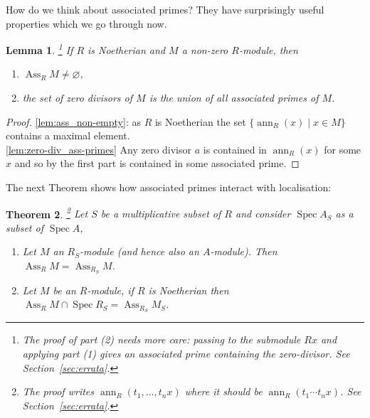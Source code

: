 \documentclass[12pt]{article}
\theoremstyle{plain}
\newtheorem{thm}{Theorem}[subsection] %
\newtheorem{lemma}[thm]{Lemma}
\theoremstyle{definition}
\begin{document}
How do we think about associated primes? They have surprisingly useful properties which we go through now.
\begin{lemma}
\label{lem:ass_nonempty_zero_div}\footnote{The proof of part (2) needs more care: passing to the submodule $Rx$ and applying part (1) gives an associated prime containing the zero-divisor. See Section~\ref{sec:errata}.}
If $R$ is Noetherian and $M$ a non-zero $R$-module, then
\begin{enumerate}
    \item\label{lem:ass_non-empty} $\operatorname{Ass}_RM \neq \varnothing$,
    \item\label{lem:zero-div_ass-primes} the set of zero divisors of $M$ is the union of all associated primes of $M$.
\end{enumerate}
\end{lemma}
\begin{proof}
\eqref{lem:ass_non-empty}: as $R$ is Noetherian the set $\lbrace \operatorname{ann}_R(x) \mid x \in M\rbrace$ contains a maximal element.\\
%
\eqref{lem:zero-div_ass-primes} Any zero divisor $a$ is contained in $\operatorname{ann}_R(x)$ for some $x$ and so by the first part is contained in some associated prime.
\end{proof}
The next Theorem shows how associated primes interact with localisation:
\begin{thm}
\label{thm:primes_loc_interact}\footnote{The proof writes $\operatorname{ann}_R(t_1,\ldots,t_n x)$ where it should be $\operatorname{ann}_R(t_1\cdots t_n x)$. See Section~\ref{sec:errata}.}
Let $S$ be a multiplicative subset of $R$ and consider $\operatorname{Spec}A_S$ as a subset of $\operatorname{Spec}A$,
\begin{enumerate}
    \item\label{thm:AS-mod} Let $M$ an $R_S$-module (and hence also an $A$-module). Then $\operatorname{Ass}_RM = \operatorname{Ass}_{R_S}M$.
    \item\label{thm:A-mod} Let $M$ be an $R$-module, if $R$ is Noetherian then $\operatorname{Ass}_RM \cap \operatorname{Spec}R_S = \operatorname{Ass}_{R_S}M_S$.
\end{enumerate}
\end{thm}
\end{document}
